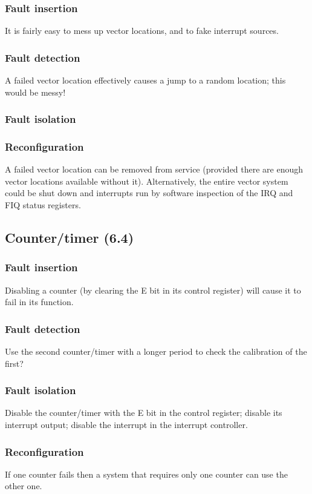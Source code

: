 \documentclass[11pt]{article}
\begin{document}
\subsubsection*{Fault insertion}
It is fairly easy to mess up vector locations, and to fake interrupt sources.
\subsubsection*{Fault detection}
A failed vector location effectively causes a jump to a random location; this would be messy!
\subsubsection*{Fault isolation}
\subsubsection*{Reconfiguration}
A failed vector location can be removed from service (provided there are enough vector locations
available without it). Alternatively, the entire vector system could be shut down and interrupts run
by software inspection of the IRQ and FIQ status registers.

\subsection{Counter/timer (6.4)}
\subsubsection*{Fault insertion}
Disabling a counter (by clearing the E bit in its control register) will cause it to fail in its function.
\subsubsection*{Fault detection}
Use the second counter/timer with a longer period to check the calibration of the first?
\subsubsection*{Fault isolation}
Disable the counter/timer with the E bit in the control register; disable its interrupt output; disable
the interrupt in the interrupt controller.
\subsubsection*{Reconfiguration}
If one counter fails then a system that requires only one counter can use the other one.
\end{document}
